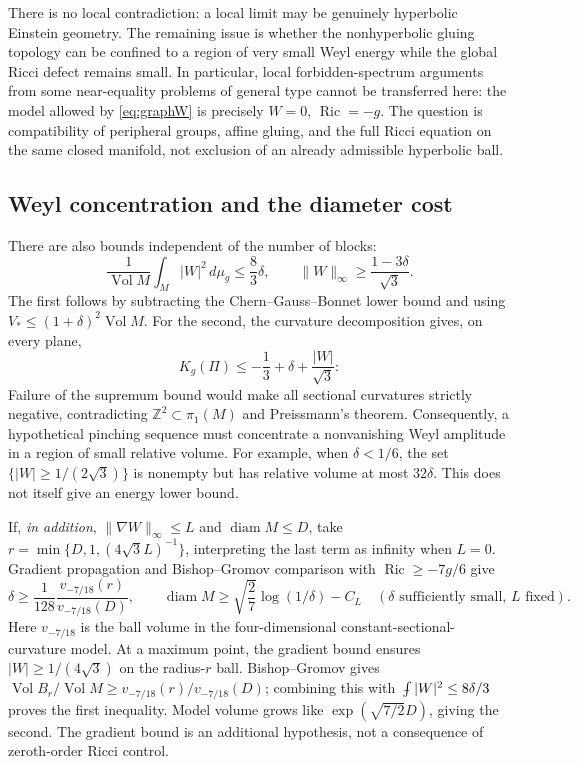 \documentclass[a4paper,11pt]{article}
\numberwithin{equation}{section}
\theoremstyle{definition}
\newcommand{\Ric}{\operatorname{Ric}}
\newcommand{\Vol}{\operatorname{Vol}}
\newcommand{\diam}{\operatorname{diam}}
\newcommand{\dd}{\,d\mu_g}
\newcommand{\fint}{\mathop{\rlap{\,\raisebox{0.1ex}{\tiny$-$}}\int}\nolimits}
\begin{document}
There is no local contradiction: a local limit may be genuinely hyperbolic Einstein geometry. The remaining issue is whether the nonhyperbolic gluing topology can be confined to a region of very small Weyl energy while the global Ricci defect remains small.
In particular, local forbidden-spectrum arguments from some near-equality problems of general type cannot be transferred here: the model allowed by \eqref{eq:graphW} is precisely $W=0$, $\Ric=-g$.
The question is compatibility of peripheral groups, affine gluing, and the full Ricci equation on the same closed manifold, not exclusion of an already admissible hyperbolic ball.

\subsection{Weyl concentration and the diameter cost}
There are also bounds independent of the number of blocks:
\begin{equation}\label{eq:graphconcentration}
 \frac1{\Vol M}\int_M|W|^2\dd\le\frac83\delta,
 \qquad \|W\|_\infty\ge\frac{1-3\delta}{\sqrt3}.
\end{equation}
The first follows by subtracting the Chern--Gauss--Bonnet lower bound and using $V_*\le(1+\delta)^2\Vol M$.
For the second, the curvature decomposition gives, on every plane,
\[
 K_g(\Pi)\le-\frac13+\delta+\frac{|W|}{\sqrt3}:
\]
Failure of the supremum bound would make all sectional curvatures strictly negative, contradicting $\mathbb Z^2\subset\pi_1(M)$ and Preissmann's theorem.
Consequently, a hypothetical pinching sequence must concentrate a nonvanishing Weyl amplitude in a region of small relative volume.
For example, when $\delta<1/6$, the set $\{|W|\ge1/(2\sqrt3)\}$ is nonempty but has relative volume at most $32\delta$. This does not itself give an energy lower bound.

If, \emph{in addition}, $\|\nabla W\|_\infty\le L$ and $\diam M\le D$, take
$r=\min\{D,1,(4\sqrt3L)^{-1}\}$, interpreting the last term as infinity when $L=0$.
Gradient propagation and Bishop--Gromov comparison with $\Ric\ge-7g/6$ give
\begin{equation}\label{eq:graphdiameter}
 \delta\ge\frac1{128}\frac{v_{-7/18}(r)}{v_{-7/18}(D)},
 \qquad \diam M\ge\sqrt{\frac27}\log(1/\delta)-C_L
 \quad(\delta\text{ sufficiently small, }L\text{ fixed}).
\end{equation}
Here $v_{-7/18}$ is the ball volume in the four-dimensional constant-sectional-curvature model. At a maximum point, the gradient bound ensures $|W|\ge1/(4\sqrt3)$ on the radius-$r$ ball. Bishop--Gromov gives
$\Vol B_r/\Vol M\ge v_{-7/18}(r)/v_{-7/18}(D)$; combining this with $\fint|W|^2\le8\delta/3$ proves the first inequality. Model volume grows like $\exp(\sqrt{7/2}D)$, giving the second.
The gradient bound is an additional hypothesis, not a consequence of zeroth-order Ricci control.
\end{document}
